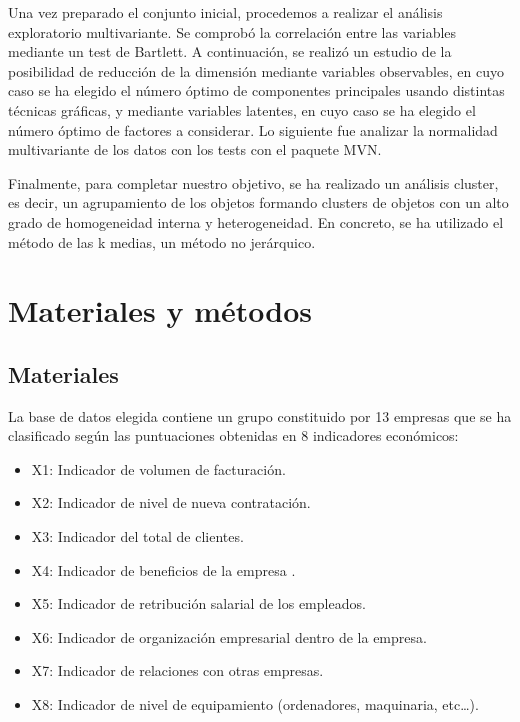\documentclass[
]{scrreprt}
\providecommand{\tightlist}{%
  \setlength{\itemsep}{0pt}\setlength{\parskip}{0pt}}
\begin{document}
Una vez preparado el conjunto inicial, procedemos a realizar el análisis
exploratorio multivariante. Se comprobó la correlación entre las
variables mediante un test de Bartlett. A continuación, se realizó un
estudio de la posibilidad de reducción de la dimensión mediante
variables observables, en cuyo caso se ha elegido el número óptimo de
componentes principales usando distintas técnicas gráficas, y mediante
variables latentes, en cuyo caso se ha elegido el número óptimo de
factores a considerar. Lo siguiente fue analizar la normalidad
multivariante de los datos con los tests con el paquete MVN.

Finalmente, para completar nuestro objetivo, se ha realizado un análisis
cluster, es decir, un agrupamiento de los objetos formando clusters de
objetos con un alto grado de homogeneidad interna y heterogeneidad. En
concreto, se ha utilizado el método de las k medias, un método no
jerárquico.

\hypertarget{materiales-y-muxe9todos}{%
\chapter{Materiales y métodos}\label{materiales-y-muxe9todos}}

\hypertarget{materiales}{%
\section{Materiales}\label{materiales}}

La base de datos elegida contiene un grupo constituido por 13 empresas
que se ha clasificado según las puntuaciones obtenidas en 8 indicadores
económicos:

\begin{itemize}
\tightlist
\item
  X1: Indicador de volumen de facturación.
\item
  X2: Indicador de nivel de nueva contratación.
\item
  X3: Indicador del total de clientes.
\item
  X4: Indicador de beneficios de la empresa .
\item
  X5: Indicador de retribución salarial de los empleados.
\item
  X6: Indicador de organización empresarial dentro de la empresa.
\item
  X7: Indicador de relaciones con otras empresas.
\item
  X8: Indicador de nivel de equipamiento (ordenadores, maquinaria,
  etc\ldots).
\end{itemize}
\end{document}
